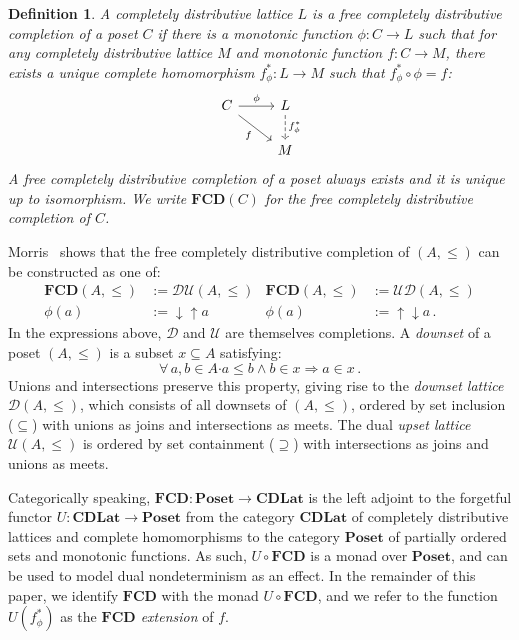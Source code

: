 \documentclass[draft,11pt]{report}
\newtheorem{definition}{Definition}
\newcommand{\bdot}{\boldsymbol{\cdot}}
\begin{document}
\begin{definition}
A completely distributive lattice $L$ is a
\emph{free completely distributive completion} of
a poset $C$ if there is
a monotonic function $\phi : C \rightarrow L$
such that
for any completely distributive lattice $M$
and monotonic function $f : C \rightarrow M$,
there exists a unique complete homomorphism $f^*_\phi : L \rightarrow M$
such that $f^*_\phi \circ \phi = f$:
\[
  \begin{tikzcd}%
    C \arrow[r, "\phi"] \arrow[rd, "f"'] &
    L \arrow[d, "f^*_\phi", dashed] \\ & M
  \end{tikzcd}
\]
A free completely distributive completion of a poset
always exists and it is unique up to isomorphism.
We write $\mathbf{FCD}(C)$ for
the free completely distributive completion of $C$.
\end{definition}

Morris~\cite{augtyp} shows that
the free completely distributive completion of $(A, \le)$
can be constructed as one of:
\begin{align*}
  \mathbf{FCD}(A, {\le}) &:= \mathcal{D} \mathcal{U}(A, {\le}) &
  \mathbf{FCD}(A, {\le}) &:= \mathcal{U} \mathcal{D}(A, {\le}) \\
  \phi(a) &:= {\downarrow}{\uparrow} a &
  \phi(a) &:= {\uparrow}{\downarrow} a \,.
\end{align*}
In the expressions above,
$\mathcal{D}$ and $\mathcal{U}$
are themselves completions.
A \emph{downset} of a poset $(A, {\le})$
is a subset $x \subseteq A$ satisfying:
\[
  \forall \, a, b \in A \bdot
          a \le b \wedge b \in x \Rightarrow a \in x \,.
\]
Unions and intersections preserve this property,
giving rise to the \emph{downset lattice} $\mathcal{D}(A, {\le})$,
which consists of all downsets of $(A, {\le})$,
ordered by set inclusion (${\subseteq}$) with
unions as joins and intersections as meets.
The dual \emph{upset lattice} $\mathcal{U}(A, {\le})$
is ordered by set containment (${\supseteq}$) with
intersections as joins and unions as meets.

Categorically speaking,
$\mathbf{FCD} : \mathbf{Poset} \rightarrow \mathbf{CDLat}$
is the left adjoint to the forgetful functor
$U : \mathbf{CDLat} \rightarrow \mathbf{Poset}$
from the category $\mathbf{CDLat}$
of completely distributive lattices and complete homomorphisms
to the category $\mathbf{Poset}$
of partially ordered sets and monotonic functions.
As such, $U \! \circ \mathbf{FCD}$ is a monad over $\mathbf{Poset}$,
and can be used to model dual nondeterminism
as an effect.
In the remainder of this paper,
we identify $\mathbf{FCD}$ with
the monad $U \! \circ \mathbf{FCD}$,
and we refer to the function
$U(f_\phi^*)$ as the \emph{$\mathbf{FCD}$ extension} of $f$.
\end{document}
